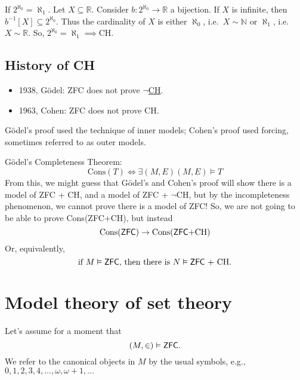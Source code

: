 \documentclass{article}
\let\models\vDash
\begin{document}
If $2^{\aleph_0} = \aleph_1$.
Let $X \subseteq \mathbb{R}$. Consider $b: 2^{\aleph_0} \to \mathbb{R}$ a bijection. If $X$ is infinite, then $b^{-1}[X] \subseteq 2^{\aleph_0}$.
Thus the cardinality of $X$ is either $\aleph_0$, i.e.\ $X \sim \mathbb{N}$ or $\aleph_1$, i.e.\ $X \sim \mathbb{R}$.
So, $2^{\aleph_0} = \aleph_1 \implies \text{CH}$.

\subsection{History of CH}
\begin{itemize}[label=--]
  \item 1938, G\"odel: \textsf{ZFC} does not prove $\neg$\hyperlink{def:ch}{CH}.
  \item 1963, Cohen: \textsf{ZFC} does not prove CH.
\end{itemize}
G\"odel's proof used the technique of inner models; Cohen's proof used forcing, sometimes referred to as outer models.

G\"odel's Completeness Theorem:
\begin{equation*}
  \text{Cons}(T) \iff \exists(M, E) (M, E) \models T
\end{equation*}
From this, we might guess that G\"odel's and Cohen's proof will show there is a model of \textsf{ZFC} + CH, and a model of \textsf{ZFC} + $\neg$CH, but by the incompleteness phenomenon, we cannot prove there is a model of \textsf{ZFC}!
So, we are not going to be able to prove Cons(\textsf{ZFC}+CH), but instead
\begin{equation*}
  \text{Cons(\textsf{ZFC})} \rightarrow \text{Cons(\textsf{ZFC}+CH)}
\end{equation*}
Or, equivalently,
\begin{equation*}
  \text{if } M \models \text{\textsf{ZFC}, then there is } N \models \text{\textsf{ZFC} + CH}.
\end{equation*}

\clearpage
\section{Model theory of set theory}
Let's assume for a moment that
\begin{equation*}
  (M,\in) \models \text{\textsf{ZFC}}.
\end{equation*}
We refer to the canonical objects in $M$ by the usual symbols, e.g., $0,1,2,3,4,\dotsc, \omega, \omega+1, \dotsc$
\end{document}
